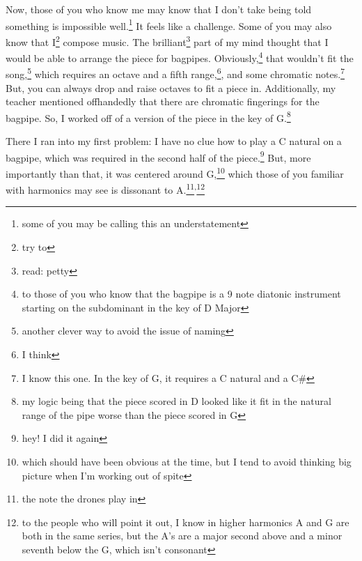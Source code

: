 \documentclass[12pt]{article}[titlepage]
\newcommand{\1}{\={a}}
\newcommand{\2}{\={e}}
\newcommand{\3}{\={\i}}
\newcommand{\4}{\=o}
\newcommand{\5}{\=u}
\newcommand{\6}{\={A}}
\renewcommand{\,}{\textsuperscript{,}}
\begin{document}
Now, those of you who know me may know that I don't take being told something is impossible well.\footnote{some of you may be calling this an understatement}
It feels like a challenge.
Some of you may also know that I\footnote{try to} compose music.
The brilliant\footnote{read: petty} part of my mind thought that I would be able to arrange the piece for bagpipes.
Obviously,\footnote{to those of you who know that the bagpipe is a 9 note diatonic instrument starting on the subdominant in the key of D Major\footnotemark} that wouldn't fit the song,\footnote{another clever way to avoid the issue of naming} which requires an octave and a fifth range,\footnote{I think}, and some chromatic notes.\footnote{I know this one. In the key of G, it requires a C natural and a C\#}
But, you can always drop and raise octaves to fit a piece in.
Additionally, my teacher mentioned offhandedly that there are chromatic fingerings for the bagpipe.
So, I worked off of a version of the piece in the key of G.\footnote{my logic being that the piece scored in D looked like it fit in the natural range of the pipe worse than the piece scored in G}

There I ran into my first problem: I have no clue how to play a C natural on a bagpipe, which was required in the second half of the piece.\footnote{hey! I did it again}
But, more importantly than that, it was centered around G,\footnote{which should have been obvious at the time, but I tend to avoid thinking big picture when I'm working out of spite} which those of you familiar with harmonics may see is dissonant to A.\footnote{the note the drones play in}\,\footnote{to the people who will point it out, I know in higher harmonics A and G are both in the same series, but the A's are a major second above and a minor seventh below the G, which isn't consonant}
\end{document}
